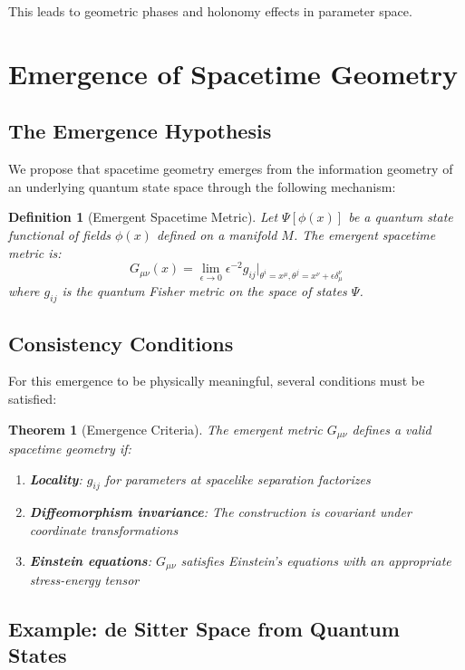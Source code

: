 \documentclass[12pt,a4paper]{article}
\newtheorem{definition}{Definition}
\newtheorem{theorem}{Theorem}
\begin{document}
This leads to geometric phases and holonomy effects in parameter space.

\section{Emergence of Spacetime Geometry}

\subsection{The Emergence Hypothesis}

We propose that spacetime geometry emerges from the information geometry of an underlying quantum state space through the following mechanism:

\begin{definition}[Emergent Spacetime Metric]
Let $\Psi[\phi(x)]$ be a quantum state functional of fields $\phi(x)$ defined on a manifold $M$. The emergent spacetime metric is:
\begin{equation}
G_{\mu\nu}(x) = \lim_{\epsilon \to 0} \epsilon^{-2} g_{ij}\Big|_{\theta^i = x^\mu, \theta^j = x^\nu + \epsilon \delta^\nu_\mu}
\end{equation}
where $g_{ij}$ is the quantum Fisher metric on the space of states $\Psi$.
\end{definition}

\subsection{Consistency Conditions}

For this emergence to be physically meaningful, several conditions must be satisfied:

\begin{theorem}[Emergence Criteria]
The emergent metric $G_{\mu\nu}$ defines a valid spacetime geometry if:
\begin{enumerate}
\item \textbf{Locality}: $g_{ij}$ for parameters at spacelike separation factorizes
\item \textbf{Diffeomorphism invariance}: The construction is covariant under coordinate transformations
\item \textbf{Einstein equations}: $G_{\mu\nu}$ satisfies Einstein's equations with an appropriate stress-energy tensor
\end{enumerate}
\end{theorem}

\subsection{Example: de Sitter Space from Quantum States}
\end{document}
